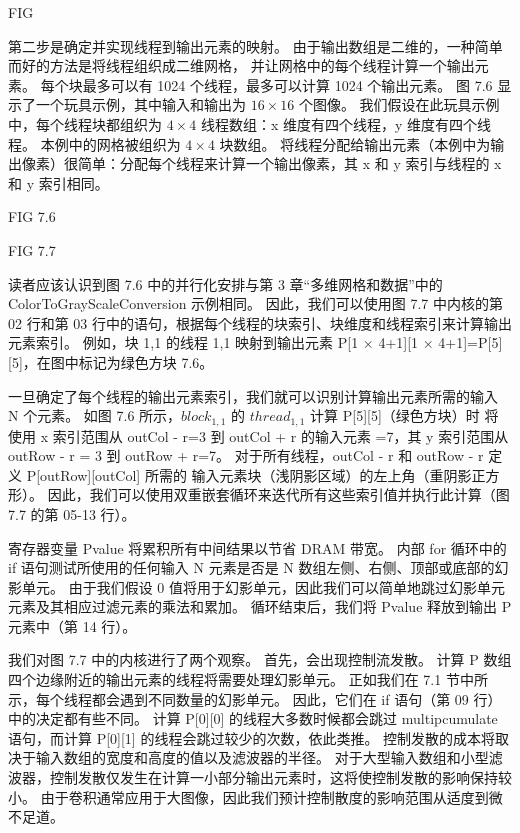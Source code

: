 {\color{red} FIG}

第二步是确定并实现线程到输出元素的映射。 由于输出数组是二维的，一种简单而好的方法是将线程组织成二维网格，
并让网格中的每个线程计算一个输出元素。 每个块最多可以有 1024 个线程，最多可以计算 1024 个输出元素。 
图 7.6 显示了一个玩具示例，其中输入和输出为 $16 \times 16$ 个图像。 
我们假设在此玩具示例中，每个线程块都组织为 $4 \times 4$ 线程数组：x 维度有四个线程，y 维度有四个线程。 
本例中的网格被组织为 $4 \times 4$ 块数组。 
将线程分配给输出元素（本例中为输出像素）很简单：分配每个线程来计算一个输出像素，其 x 和 y 索引与线程的 x 和 y 索引相同。

{\color{red} FIG 7.6}

{\color{red} FIG 7.7}

读者应该认识到图 7.6 中的并行化安排与第 3 章“多维网格和数据”中的 ColorToGrayScaleConversion 示例相同。 
因此，我们可以使用图 7.7 中内核的第 02 行和第 03 行中的语句，根据每个线程的块索引、块维度和线程索引来计算输出元素索引。 
例如，块 1,1 的线程 1,1 映射到输出元素 P[1 × 4+1][1 × 4+1]=P[5][5]，在图中标记为绿色方块 7.6。

一旦确定了每个线程的输出元素索引，我们就可以识别计算输出元素所需的输入 N 个元素。 
如图 7.6 所示，$block_{1, 1}$ 的 $thread_{1, 1}$ 计算 P[5][5]（绿色方块）时
将使用 x 索引范围从 outCol - r=3 到 outCol + r 的输入元素 =7，其 y 索引范围从 outRow - r = 3 到 outRow + r=7。 
对于所有线程，outCol - r 和 outRow - r 定义 P[outRow][outCol] 所需的
输入元素块（浅阴影区域）的左上角（重阴影正方形）。 
因此，我们可以使用双重嵌套循环来迭代所有这些索引值并执行此计算（图 7.7 的第 05-13 行）。

寄存器变量 Pvalue 将累积所有中间结果以节省 DRAM 带宽。 
内部 for 循环中的 if 语句测试所使用的任何输入 N 元素是否是 N 数组左侧、右侧、顶部或底部的幻影单元。 
由于我们假设 0 值将用于幻影单元，因此我们可以简单地跳过幻影单元元素及其相应过滤元素的乘法和累加。 
循环结束后，我们将 Pvalue 释放到输出 P 元素中（第 14 行）。

我们对图 7.7 中的内核进行了两个观察。 首先，会出现控制流发散。 
计算 P 数组四个边缘附近的输出元素的线程将需要处理幻影单元。 正如我们在 7.1 节中所示，每个线程都会遇到不同数量的幻影单元。 
因此，它们在 if 语句（第 09 行）中的决定都有些不同。 
计算 P[0][0] 的线程大多数时候都会跳过 multipcumulate 语句，而计算 P[0][1] 的线程会跳过较少的次数，依此类推。 
控制发散的成本将取决于输入数组的宽度和高度的值以及滤波器的半径。 
对于大型输入数组和小型滤波器，控制发散仅发生在计算一小部分输出元素时，这将使控制发散的影响保持较小。 
由于卷积通常应用于大图像，因此我们预计控制散度的影响范围从适度到微不足道。

